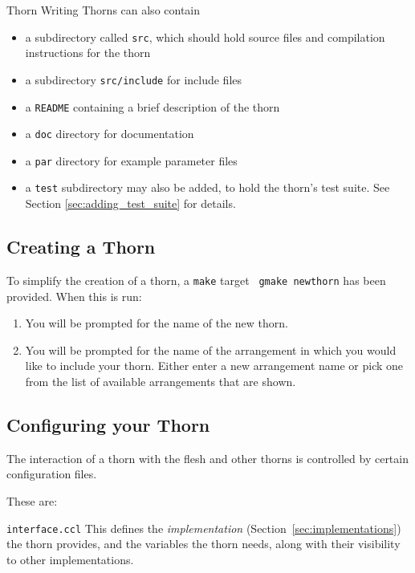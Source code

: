 \begin{cactuspart}{Thorn Writing}
Thorns can also contain
\begin{itemize}
\item a subdirectory called \texttt{src}, which should hold source files
        and compilation instructions for the thorn
\item a subdirectory \texttt{src/include} for include files
\item a \texttt{README} containing a brief description of the thorn
\item a \texttt{doc} directory for documentation
\item a \texttt{par} directory for example parameter files
\item a \texttt{test} subdirectory may also be added, to hold the thorn's
    test suite. See Section \ref{sec:adding_test_suite} for details.
\end{itemize}


\subsection{Creating a Thorn}


To simplify the creation of a thorn, a \texttt{make} target {\tt
gmake newthorn} has been provided. When this is run:

\begin{enumerate}
\item{} You will be prompted for the name of the new thorn.
\item{} You will be prompted for the name of the arrangement in which you
would like to include your thorn. Either enter a new arrangement name or
pick one from the list of available arrangements that are shown.
\end{enumerate}


\subsection{Configuring your Thorn}

The interaction of a thorn with the flesh and other thorns is controlled
by certain configuration files.

These are:

\begin{Lentry}

\item [\texttt{interface.ccl}]
This defines the \textit{implementation} (Section~\ref{sec:implementations})
the thorn provides, and the variables the thorn needs, along with their
visibility to other implementations.


\end{Lentry}
\end{cactuspart}
